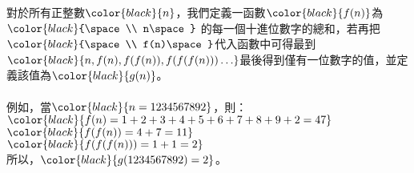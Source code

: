 對於所有正整數$\color{black}{\space n\space}$，我們定義一函數$\color{black}{\space f(n)\space}$為$\color{black}{\space\\
n\space}$ 的每一個十進位數字的總和，若再把$\color{black}{\space\\
f(n)\space}$代入函數中可得最到$\color{black}{\space n,f(n),f(f(n)),f(f(f(n))) \dots\space}$最後得到僅有一位數字的值，並定義該值為$\color{black}{\space g(n)\space}$。\\
\\
例如，當$\color{black}{\space n=1234567892\space}$，則：\\
$\color{black}{\space f(n)=1+2+3+4+5+6+7+8+9+2=47\space}$\\
$\color{black}{\space f(f(n))=4+7=11\space}$\\
$\color{black}{\space f(f(f(n)))=1+1=2\space}$\\
所以，$\color{black}{\space g(1234567892)=2\space}$。\\
